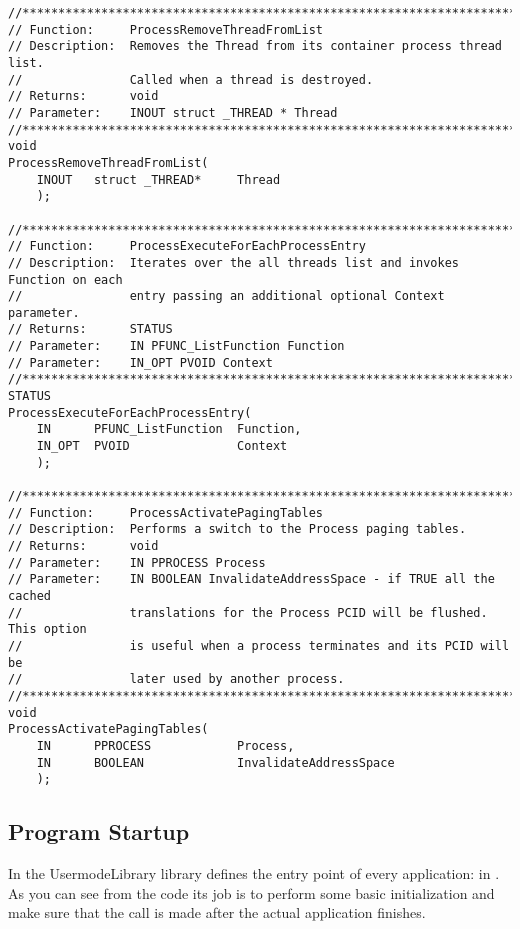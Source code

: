 \begin{appendices}
\begin{lstlisting}[caption={Process Private Interface},label={lst:ProcPrivate}]
//******************************************************************************
// Function:     ProcessRemoveThreadFromList
// Description:  Removes the Thread from its container process thread list.
//               Called when a thread is destroyed.
// Returns:      void
// Parameter:    INOUT struct _THREAD * Thread
//******************************************************************************
void
ProcessRemoveThreadFromList(
    INOUT   struct _THREAD*     Thread
    );

//******************************************************************************
// Function:     ProcessExecuteForEachProcessEntry
// Description:  Iterates over the all threads list and invokes Function on each
//               entry passing an additional optional Context parameter.
// Returns:      STATUS
// Parameter:    IN PFUNC_ListFunction Function
// Parameter:    IN_OPT PVOID Context
//******************************************************************************
STATUS
ProcessExecuteForEachProcessEntry(
    IN      PFUNC_ListFunction  Function,
    IN_OPT  PVOID               Context
    );

//******************************************************************************
// Function:     ProcessActivatePagingTables
// Description:  Performs a switch to the Process paging tables.
// Returns:      void
// Parameter:    IN PPROCESS Process
// Parameter:    IN BOOLEAN InvalidateAddressSpace - if TRUE all the cached
//               translations for the Process PCID will be flushed. This option
//               is useful when a process terminates and its PCID will be
//               later used by another process.
//******************************************************************************
void
ProcessActivatePagingTables(
    IN      PPROCESS            Process,
    IN      BOOLEAN             InvalidateAddressSpace
    );
\end{lstlisting}

\subsection{Program Startup}
\label{sect:ProgramStart}

In \projectname the UsermodeLibrary library defines the entry point of every application:
 in . As you can see from the code its job is to perform some basic
initialization and make sure that the  call is made after the actual
application finishes.


\end{appendices}

